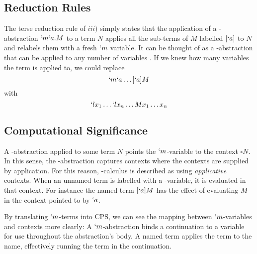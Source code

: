   \subsection{Reduction Rules}
  \begin{figure}[H]
  \end{figure}

  The terse reduction rule of $iii)$ simply states that the application of a \lmu-abstraction $`m`a.M$ to a term $N$ applies all the sub-terms of $M$ labelled $[`a]$ to $N$ and relabels them with a fresh $`m$ variable.
  It can be thought of as a \lam-abstraction that can be applied to any number of variables \cite{Parigot92}.
  If we knew how many variables the term is applied to, we could replace
  \[ `m`a\dots[`a]M \]
  with 
  \[ `lx_1\dots`lx_n\dots Mx_1\dots x_n \]
  
  \subsection{Computational Significance}

  A \lmu-abstraction applied to some term $N$ points the $`m$-variable to the context $\square N$.
  In this sense, the \lmu-abstraction captures contexts where the contexts are supplied by application.
  For this reason, \lmu-calculus is described as using \emph{applicative} contexts.
  When an unnamed term is labelled with a \lmu-variable, it is evaluated in that context. 
  For instance the named term $[`a]M$ has the effect of evaluating $M$ in the context pointed to by $`a$.
  
  By translating $`m$-terms into CPS, we can see the mapping between $`m$-variables and contexts more clearly:
  A $`m$-abstraction binds a continuation to a variable for use throughout the abstraction's body.
  A named term applies the term to the name, effectively running the term in the continuation.
  
